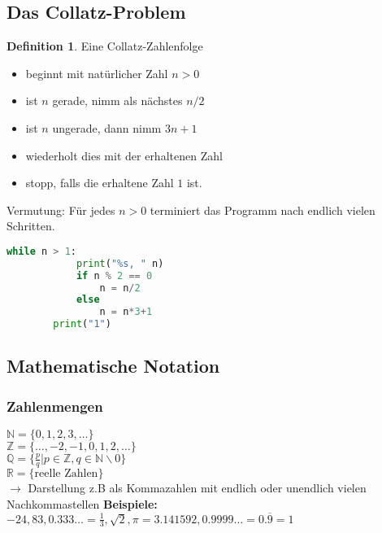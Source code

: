 \documentclass[a4paper,12pt]{article}
\theoremstyle{definition}
\newtheorem{definition}[axiom]{Definition}
\begin{document}
	\newpage
	\subsection{Das Collatz-Problem}
	\begin{definition}
		Eine Collatz-Zahlenfolge
		\begin{itemize}[label=-]
			\item beginnt mit natürlicher Zahl $n>0$
			\item ist $n$ gerade, nimm als nächstes $n/2$
			\item ist $n$ ungerade, dann nimm $3n+1$
			\item wiederholt dies mit der erhaltenen Zahl
			\item stopp, falls die erhaltene Zahl $1$ ist.
		\end{itemize}
	\end{definition}
	Vermutung: Für jedes $n>0$ terminiert das Programm nach endlich vielen Schritten.
	
	\begin{lstlisting}[language=Python,captionpos=b,caption={Code für die Collatz-Conjecture}]
		while n > 1:
			print("%s, " n)
			if n % 2 == 0
				n = n/2
			else
				n = n*3+1
		print("1") \end{lstlisting}
	
	
	
	\subsection{Mathematische Notation}
	\subsubsection{Zahlenmengen}
	$\mathbb{N} = \{0,1,2,3,\dots\}$\\
	$\mathbb{Z} = \{\dots,-2,-1,0,1,2,\dots\}$\\
	$\mathbb{Q} = \{\frac{p}{q} | p \in \mathbb{Z}, q \in \mathbb{N}\backslash0\}$\\
	$\mathbb{R} = \{\text{reelle Zahlen}\}$\\
	$\rightarrow$ Darstellung z.B als Kommazahlen mit endlich oder unendlich vielen Nachkommastellen
	{\bfseries Beispiele:} $-24,83, 0.333\dots = \frac{1}{3}, \sqrt{2}, \pi = 3.141592, 0.9999\dots = 0.\overline{9} = 1$
\end{document}
